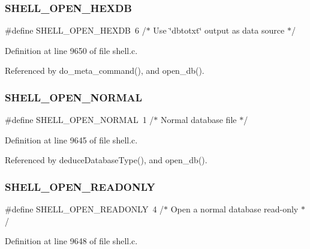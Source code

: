 \subsubsection{S\+H\+E\+L\+L\+\_\+\+O\+P\+E\+N\+\_\+\+H\+E\+X\+DB}
{\footnotesize\ttfamily \#define S\+H\+E\+L\+L\+\_\+\+O\+P\+E\+N\+\_\+\+H\+E\+X\+DB~6      /$\ast$ Use \char`\"{}dbtotxt\char`\"{} output as data source $\ast$/}



Definition at line 9650 of file shell.\+c.



Referenced by do\+\_\+meta\+\_\+command(), and open\+\_\+db().

\mbox{\label{shell_8c_adfc88c60db902759fb0ea7121ab82fa1}} 
\subsubsection{S\+H\+E\+L\+L\+\_\+\+O\+P\+E\+N\+\_\+\+N\+O\+R\+M\+AL}
{\footnotesize\ttfamily \#define S\+H\+E\+L\+L\+\_\+\+O\+P\+E\+N\+\_\+\+N\+O\+R\+M\+AL~1      /$\ast$ Normal database file $\ast$/}



Definition at line 9645 of file shell.\+c.



Referenced by deduce\+Database\+Type(), and open\+\_\+db().

\mbox{\label{shell_8c_a8dda59719a3fd1891098a8d89737164a}} 
\subsubsection{S\+H\+E\+L\+L\+\_\+\+O\+P\+E\+N\+\_\+\+R\+E\+A\+D\+O\+N\+LY}
{\footnotesize\ttfamily \#define S\+H\+E\+L\+L\+\_\+\+O\+P\+E\+N\+\_\+\+R\+E\+A\+D\+O\+N\+LY~4      /$\ast$ Open a normal database read-\/only $\ast$/}



Definition at line 9648 of file shell.\+c.



